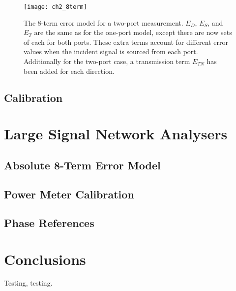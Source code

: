 \documentclass[../thesis.tex]{subfiles}
\begin{document}
\begin{refsection}
\begin{figure}
	\centering
	\texttt{[image: ch2\_8term]}
	\caption{The 8-term error model for a two-port measurement. $E_D$, $E_S$, and $E_T$ are the same as for the one-port model, except there are now sets of each for both ports. These extra terms account for different error values when the incident signal is sourced from each port. Additionally for the two-port case, a transmission term $E_{TN}$ has been added for each direction.}
	\label{ch2_8term}
\end{figure}


\subsection{Calibration}
\section{Large Signal Network Analysers}
\subsection{Absolute 8-Term Error Model}
\subsection{Power Meter Calibration}
\subsection{Phase References}
\section{Conclusions}
Testing, testing\cite{Stant_2016_Coll, Stant_2016}.
\printbibliography
\end{refsection}
\end{document}
